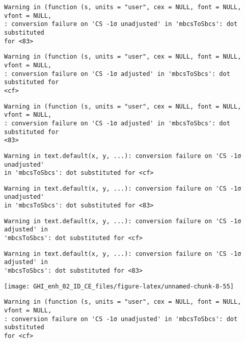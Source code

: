 \documentclass[
  10pt,
  a4paper,oneside]{article}
\begin{document}
\begin{verbatim}
Warning in (function (s, units = "user", cex = NULL, font = NULL, vfont = NULL,
: conversion failure on 'CS -1σ unadjusted' in 'mbcsToSbcs': dot substituted
for <83>
\end{verbatim}

\begin{verbatim}
Warning in (function (s, units = "user", cex = NULL, font = NULL, vfont = NULL,
: conversion failure on 'CS -1σ adjusted' in 'mbcsToSbcs': dot substituted for
<cf>
\end{verbatim}

\begin{verbatim}
Warning in (function (s, units = "user", cex = NULL, font = NULL, vfont = NULL,
: conversion failure on 'CS -1σ adjusted' in 'mbcsToSbcs': dot substituted for
<83>
\end{verbatim}

\begin{verbatim}
Warning in text.default(x, y, ...): conversion failure on 'CS -1σ unadjusted'
in 'mbcsToSbcs': dot substituted for <cf>
\end{verbatim}

\begin{verbatim}
Warning in text.default(x, y, ...): conversion failure on 'CS -1σ unadjusted'
in 'mbcsToSbcs': dot substituted for <83>
\end{verbatim}

\begin{verbatim}
Warning in text.default(x, y, ...): conversion failure on 'CS -1σ adjusted' in
'mbcsToSbcs': dot substituted for <cf>
\end{verbatim}

\begin{verbatim}
Warning in text.default(x, y, ...): conversion failure on 'CS -1σ adjusted' in
'mbcsToSbcs': dot substituted for <83>
\end{verbatim}

\begin{center}\texttt{[image: GHI\_enh\_02\_ID\_CE\_files/figure-latex/unnamed-chunk-8-55]} \end{center}

\begin{verbatim}
Warning in (function (s, units = "user", cex = NULL, font = NULL, vfont = NULL,
: conversion failure on 'CS -1σ unadjusted' in 'mbcsToSbcs': dot substituted
for <cf>
\end{verbatim}
\end{document}
